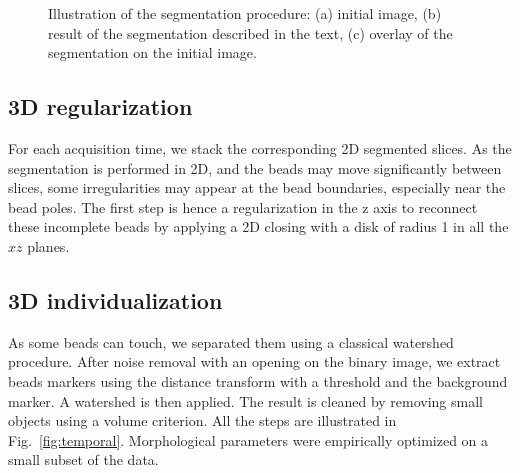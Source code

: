 \documentclass{llncs}
\begin{document}
\begin{figure}
\centering
{}
\caption{Illustration of the segmentation procedure: (a) initial image, (b) result of the segmentation described in the text,  (c) overlay of the segmentation on the initial image.}
\label{fig:seg1}
\end{figure}


\subsection{3D regularization}
For each acquisition time, we stack the corresponding 2D segmented slices. As the segmentation is performed in 2D, and the beads may move significantly between slices, some irregularities may appear at the bead boundaries, especially near the bead poles. The first step is hence a regularization in the z axis to reconnect these incomplete beads by applying a 2D closing with a disk of radius 1 in all the $xz$ planes.

\subsection{3D individualization}
As some beads can touch, we separated them using a classical watershed procedure. After noise removal with an opening on the binary image, we extract beads markers using the distance transform with a threshold and the background marker. A watershed is then applied. The result is cleaned by removing small objects using a volume criterion. All the steps are illustrated in Fig.~\ref{fig:temporal}. Morphological parameters were empirically optimized on a small subset of the data.
\end{document}
